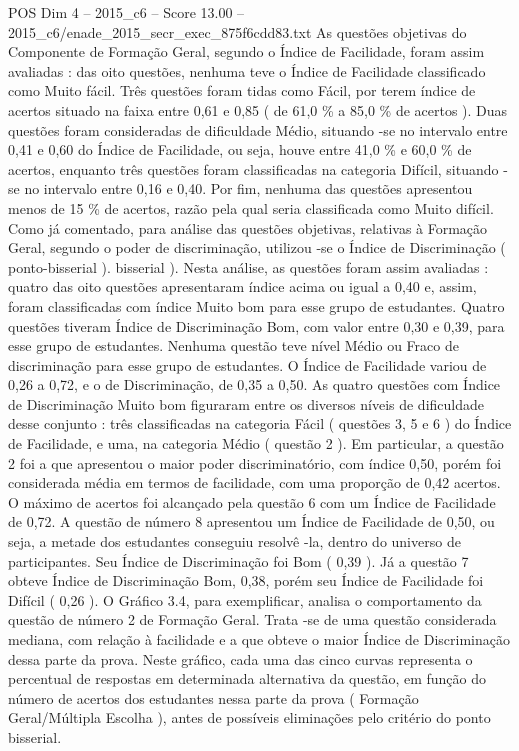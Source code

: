 \begin{textsample}{POS Dim 4 – 2015\_c6 – Score 13.00 – 2015\_c6/enade\_2015\_secr\_exec\_875f6cdd83.txt}
As questões objetivas do Componente de Formação Geral, segundo o Índice de Facilidade, foram assim avaliadas : das oito questões, nenhuma teve o Índice de Facilidade classificado como Muito fácil.
Três questões foram tidas como Fácil, por terem índice de acertos situado na faixa entre 0,61 e 0,85 ( de 61,0 \% a 85,0 \% de acertos ).
Duas questões foram consideradas de dificuldade Médio, situando -se no intervalo entre 0,41 e 0,60 do Índice de Facilidade, ou seja, houve entre 41,0 \% e 60,0 \% de acertos, enquanto três questões foram classificadas na categoria Difícil, situando -se no intervalo entre 0,16 e 0,40.
Por fim, nenhuma das questões apresentou menos de 15 \% de acertos, razão pela qual seria classificada como Muito difícil.
Como já comentado, para análise das questões objetivas, relativas à Formação Geral, segundo o poder de discriminação, utilizou -se o Índice de Discriminação ( ponto-bisserial ). bisserial ).
Nesta análise, as questões foram assim avaliadas : quatro das oito questões apresentaram índice acima ou igual a 0,40 e, assim, foram classificadas com índice Muito bom para esse grupo de estudantes.
Quatro questões tiveram Índice de Discriminação Bom, com valor entre 0,30 e 0,39, para esse grupo de estudantes.
Nenhuma questão teve nível Médio ou Fraco de discriminação para esse grupo de estudantes.
O Índice de Facilidade variou de 0,26 a 0,72, e o de Discriminação, de 0,35 a 0,50.
As quatro questões com Índice de Discriminação Muito bom figuraram entre os diversos níveis de dificuldade desse conjunto : três classificadas na categoria Fácil ( questões 3, 5 e 6 ) do Índice de Facilidade, e uma, na categoria Médio ( questão 2 ).
Em particular, a questão 2 foi a que apresentou o maior poder discriminatório, com índice 0,50, porém foi considerada média em termos de facilidade, com uma proporção de 0,42 acertos.
O máximo de acertos foi alcançado pela questão 6 com um Índice de Facilidade de 0,72.
A questão de número 8 apresentou um Índice de Facilidade de 0,50, ou seja, a metade dos estudantes conseguiu resolvê -la, dentro do universo de participantes.
Seu Índice de Discriminação foi Bom ( 0,39 ).
Já a questão 7 obteve Índice de Discriminação Bom, 0,38, porém seu Índice de Facilidade foi Difícil ( 0,26 ).
O Gráfico 3.4, para exemplificar, analisa o comportamento da questão de número 2 de Formação Geral.
Trata -se de uma questão considerada mediana, com relação à facilidade e a que obteve o maior Índice de Discriminação dessa parte da prova.
Neste gráfico, cada uma das cinco curvas representa o percentual de respostas em determinada alternativa da questão, em função do número de acertos dos estudantes nessa parte da prova ( Formação Geral/Múltipla Escolha ), antes de possíveis eliminações pelo critério do ponto bisserial.

\end{textsample}
